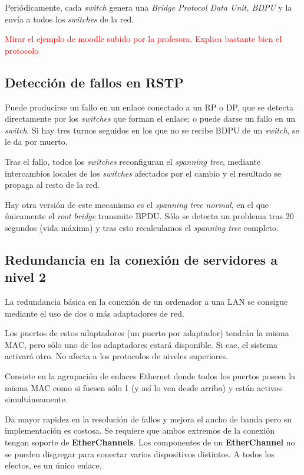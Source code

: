 Periódicamente, cada \textit{switch} genera una \textit{Bridge Protocol Data Unit, BDPU} y la envía a todos los \textit{switches} de la red.

\textcolor{red}{Mirar el ejemplo de moodle subido por la profesora. Explica bastante bien el protocolo}

\subsection{Detección de fallos en RSTP}
Puede producirse un fallo en un enlace conectado a un RP o DP, que se detecta directamente por los \textit{switches} que forman el enlace; o puede darse un fallo en un \textit{switch}. Si hay tres turnos seguidos en los que no se recibe BDPU de un \textit{switch}, se le da por muerto.

Tras el fallo, todos los \textit{switches} reconfiguran el \textit{spanning tree}, mediante intercambios locales de los \textit{switches} afectados por el cambio y el resultado se propaga al resto de la red.

\obs Hay otra versión de este mecanismo es el \textit{spanning tree normal}, en el que únicamente el \textit{root bridge} transmite BPDU. Sólo se detecta un problema tras 20 segundos (vida máxima) y tras esto recalculamos el \textit{spanning tree} completo.

\subsection{Redundancia en la conexión de servidores a nivel 2}
La redundancia básica en la conexión de un ordenador a una LAN se consigue mediante el uso de dos o más adaptadores de red.

Los puertos de estos adaptadores (un puerto por adaptador) tendrán la misma MAC, pero sólo uno de los adaptadores estará disponible. Si cae, el sistema activará otro. No afecta a los protocolos de niveles superiores.

\begin{defn}[EtherChannels]
Consiste en la agrupación de enlaces Ethernet donde todos los puertos poseen la misma MAC como si fuesen sólo 1 (y así lo ven desde arriba) y están activos simultáneamente.

Da mayor rapidez en la resolución de fallos y mejora el ancho de banda pero su implementación es costosa. Se requiere que ambos extremos de la conexión tengan soporte de \textbf{EtherChannels}. Los componentes de un \textbf{EtherChannel} no se pueden disgregar para conectar varios dispositivos distintos. A todos los efectos, es un único enlace.

\end{defn}

